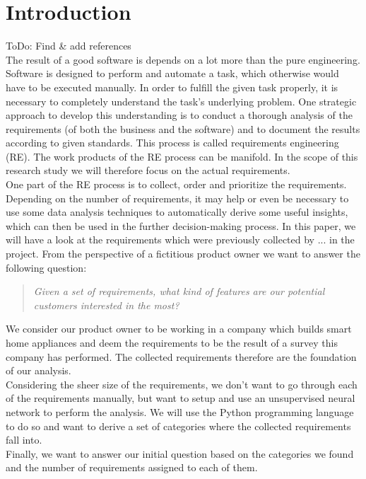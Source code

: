 \section{Introduction} %
\label{sec:introduction}
\colorbox{yellow!30}{ToDo: Find \& add references}\\
The result of a good software is depends on a lot more than the pure engineering.
Software is designed to perform and automate a task, which otherwise would have to be executed manually.
In order to fulfill the given task properly, it is necessary to completely understand the task's underlying problem. One strategic approach to develop this understanding is to conduct a thorough analysis of the requirements (of both the business and the software) and to document the results according to given standards. This process is called requirements engineering (RE). The work products of the RE process can be manifold. In the scope of this research study we will therefore focus on the actual requirements.\\

One part of the RE process is to collect, order and prioritize the requirements. Depending on the number of requirements, it may help or even be necessary to use some data analysis techniques to automatically derive some useful insights, which can then be used in the further decision-making process.
In this paper, we will have a look at the requirements which were previously collected by ... in the \crowdre{} project. From the perspective of a fictitious product owner we want to answer the following question:\\
\begin{quote}
\textit{Given a set of requirements, what kind of features are our potential customers interested in the most?}
\end{quote}

We consider our product owner to be working in a company which builds smart home appliances and deem the \crowdre{} requirements to be the result of a survey this company has performed. The collected requirements therefore are the foundation of our analysis.\\
Considering the sheer size of the requirements, we don't want to go through each of the requirements manually, but want to setup and use an unsupervised neural network to perform the analysis. We will use the Python programming language to do so and want to derive a set of categories where the collected requirements fall into.\\
Finally, we want to answer our initial question based on the categories we found and the number of requirements assigned to each of them.
